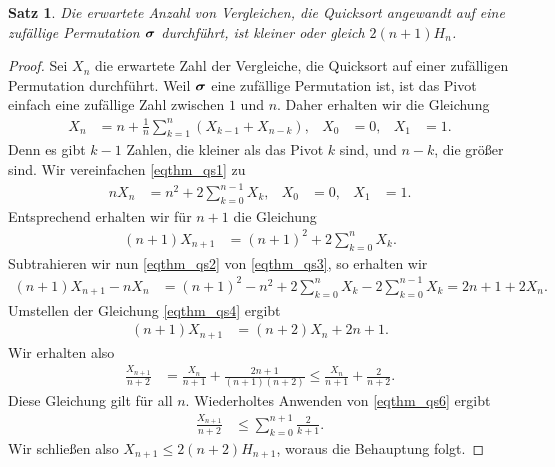 \documentclass[10pt,reqno]{amsart}
\numberwithin{equation}{section}
\newcommand\vX{\vec X}
\def\vec#1{\mathchoice{\mbox{\boldmath$\displaystyle#1$}}
{\mbox{\boldmath$\textstyle#1$}}
{\mbox{\boldmath$\scriptstyle#1$}}
{\mbox{\boldmath$\scriptscriptstyle#1$}}}
\newtheorem{theorem}[definition]{Satz}
\newcommand\bc[1]{\left({#1}\right)}
\newcommand\Sec{Abschnitt}
\begin{document}
\begin{theorem}\label{thm_qs}
	Die erwartete Anzahl von Vergleichen, die Quicksort angewandt auf eine zuf\"allige Permutation $\vec\sigma$ durchf\"uhrt, ist kleiner oder gleich $2(n+1)H_n$.
\end{theorem}
\begin{proof}
	Sei $X_n$ die erwartete Zahl der Vergleiche, die Quicksort auf einer zuf\"alligen Permutation durchf\"uhrt.
	Weil $\vec\sigma$ eine zuf\"allige Permutation ist, ist das Pivot einfach eine zuf\"allige Zahl zwischen $1$ und $n$.
	Daher erhalten wir die Gleichung
	\begin{align}\label{eqthm_qs1}
		X_n&=n+\frac1n\sum_{k=1}^n\bc{X_{k-1}+X_{n-k}},&X_0&=0,&X_1&=1.
	\end{align}
	Denn es gibt $k-1$ Zahlen, die kleiner als das Pivot $k$ sind, und $n-k$, die gr\"o\ss er sind.
	Wir vereinfachen \eqref{eqthm_qs1} zu
	\begin{align}\label{eqthm_qs2}
		nX_n&=n^2+2\sum_{k=0}^{n-1}X_{k},&X_0&=0,&X_1&=1.
	\end{align}
	Entsprechend erhalten wir f\"ur $n+1$ die Gleichung
	\begin{align}\label{eqthm_qs3}
		(n+1)X_{n+1}&=(n+1)^2+2\sum_{k=0}^{n}X_{k}.
	\end{align}
	Subtrahieren wir nun \eqref{eqthm_qs2} von \eqref{eqthm_qs3}, so erhalten wir
	\begin{align}\label{eqthm_qs4}
		(n+1)X_{n+1}-nX_n&=(n+1)^2-n^2+2\sum_{k=0}^{n}X_{k}-2\sum_{k=0}^{n-1}X_k=2n+1+2X_n.
	\end{align}
	Umstellen der Gleichung \eqref{eqthm_qs4} ergibt
	\begin{align}\label{eqthm_qs5}
		(n+1)X_{n+1}&=(n+2)X_n+2n+1.
	\end{align}
	Wir erhalten also
	\begin{align}\label{eqthm_qs6}
		\frac{X_{n+1}}{n+2}&=\frac{X_n}{n+1}+\frac{2n+1}{(n+1)(n+2)}\leq\frac{X_n}{n+1}+\frac{2}{n+2}.
	\end{align}
	Diese Gleichung gilt f\"ur all $n$.
	Wiederholtes Anwenden von \eqref{eqthm_qs6} ergibt
	\begin{align*}
		\frac{X_{n+1}}{n+2}&\leq\sum_{k=0}^{n+1}\frac2{k+1}.
	\end{align*}
	Wir schlie\ss en also $X_{n+1}\leq2(n+2)H_{n+1}$, woraus die Behauptung folgt.

\end{proof}
\end{document}
